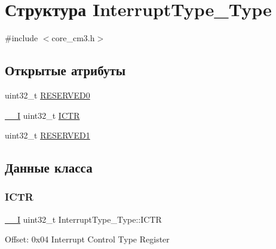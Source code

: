 \hypertarget{struct_interrupt_type___type}{}\section{Структура Interrupt\+Type\+\_\+\+Type}
\label{struct_interrupt_type___type}


{\ttfamily \#include $<$core\+\_\+cm3.\+h$>$}

\subsection*{Открытые атрибуты}
\begin{DoxyCompactItemize}
\item 
uint32\+\_\+t \mbox{\hyperlink{struct_interrupt_type___type_ae0d588643b0488fce4c0a90b85edf362}{R\+E\+S\+E\+R\+V\+E\+D0}}
\item 
\mbox{\hyperlink{group___c_m_s_i_s___c_m3__core__definitions_gaf63697ed9952cc71e1225efe205f6cd3}{\+\_\+\+\_\+I}} uint32\+\_\+t \mbox{\hyperlink{struct_interrupt_type___type_a2b10f6d37363a6b798ac97f4c4db1e63}{I\+C\+TR}}
\item 
uint32\+\_\+t \mbox{\hyperlink{struct_interrupt_type___type_a45933eb981309d50f943ec3af67f17be}{R\+E\+S\+E\+R\+V\+E\+D1}}
\end{DoxyCompactItemize}


\subsection{Данные класса}
\mbox{\label{struct_interrupt_type___type_a2b10f6d37363a6b798ac97f4c4db1e63}} 
\subsubsection{\texorpdfstring{ICTR}{ICTR}}
{\footnotesize\ttfamily \mbox{\hyperlink{group___c_m_s_i_s___c_m3__core__definitions_gaf63697ed9952cc71e1225efe205f6cd3}{\+\_\+\+\_\+I}} uint32\+\_\+t Interrupt\+Type\+\_\+\+Type\+::\+I\+C\+TR}

Offset\+: 0x04 Interrupt Control Type Register \mbox{\label{struct_interrupt_type___type_ae0d588643b0488fce4c0a90b85edf362}} 
